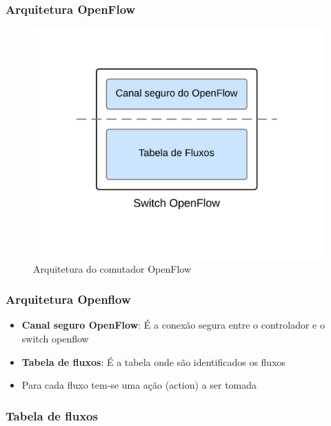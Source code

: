 %
%
\begin{frame}\frametitle{Arquitetura OpenFlow}

    \begin{figure}[h!]
        \centering
        \label{fig:switch-arch}
        \includegraphics[width=\linewidth]{images/switch-architecture}
        \caption{Arquitetura do comutador OpenFlow}
    \end{figure}

\end{frame}



%
%
\begin{frame}\frametitle{Arquitetura Openflow}

    \begin{itemize}
        \setlength{\itemsep}{.5cm}
    \item \textbf{Canal seguro OpenFlow}: É a conexão segura entre o
          controlador e o switch openflow
    \item \textbf{Tabela de fluxos}: É a tabela onde são identificados os fluxos
    \item Para cada fluxo tem-se uma ação (action) a ser tomada
    \end{itemize}
\end{frame}


%
%
\begin{frame}\frametitle{Tabela de fluxos}
    
\end{frame}

